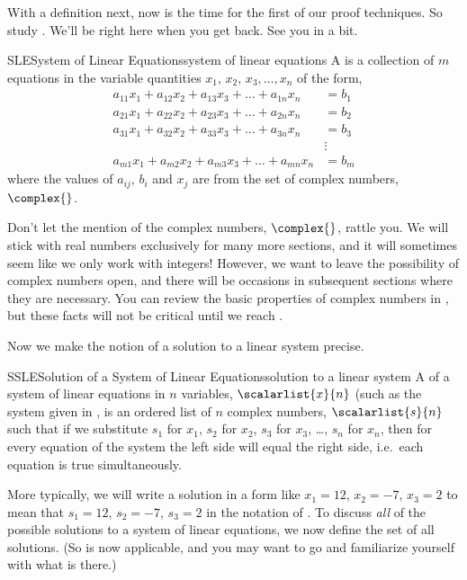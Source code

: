 %
With a definition next, now is the time for the first of our proof techniques.
So study .  We'll be right here when you get back.  See you in a bit.\par
%
\begin{definition}{SLE}{System of Linear Equations}{system of linear equations}
A  is a collection of $m$ equations in the variable quantities $x_1,\,x_2,\,x_3,\ldots,x_n$ of the form,
\begin{align*}
a_{11}x_1+a_{12}x_2+a_{13}x_3+\dots+a_{1n}x_n&=b_1\\
a_{21}x_1+a_{22}x_2+a_{23}x_3+\dots+a_{2n}x_n&=b_2\\
a_{31}x_1+a_{32}x_2+a_{33}x_3+\dots+a_{3n}x_n&=b_3\\
&\vdots\\
a_{m1}x_1+a_{m2}x_2+a_{m3}x_3+\dots+a_{mn}x_n&=b_m
\end{align*}
where the values of $a_{ij}$, $b_i$ and $x_j$ are from the set of complex numbers, $\complex{\null}$.
\end{definition}
%
Don't let the mention of the complex numbers, $\complex{\null}$, rattle you.  We will stick with real numbers exclusively for many more sections, and it will sometimes seem like we only work with integers!  However, we want to leave the possibility of complex numbers open, and there will be occasions in subsequent sections where they are necessary.  You can review the basic properties of complex numbers in , but these facts will not be critical until we reach .\par
%
Now we make the notion of a solution to a linear system precise.
%
\begin{definition}{SSLE}{Solution of a System of Linear Equations}{solution to a linear system}
A  of a system of linear equations in $n$ variables, $\scalarlist{x}{n}$ (such as the system given in , is an ordered list of $n$ complex numbers, $\scalarlist{s}{n}$ such that if we substitute $s_1$ for $x_1$, $s_2$ for $x_2$, $s_3$ for $x_3$, \dots, $s_n$ for $x_n$,  then for every equation of the system the left side will equal the right side, i.e.\ each equation is true simultaneously.
\end{definition}
%
More typically, we will write a solution in a form like $x_1=12$, $x_2=-7$, $x_3=2$ to mean that $s_1=12$, $s_2=-7$, $s_3=2$ in the notation of .  To discuss {\em all} of the possible solutions to a system of linear equations, we now define the set of all solutions.  (So  is now applicable, and you may want to go and familiarize yourself with what is there.)
